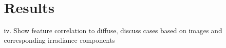 \chapter{Results}
iv.	Show feature correlation to diffuse, discuss cases based on images and corresponding irradiance components